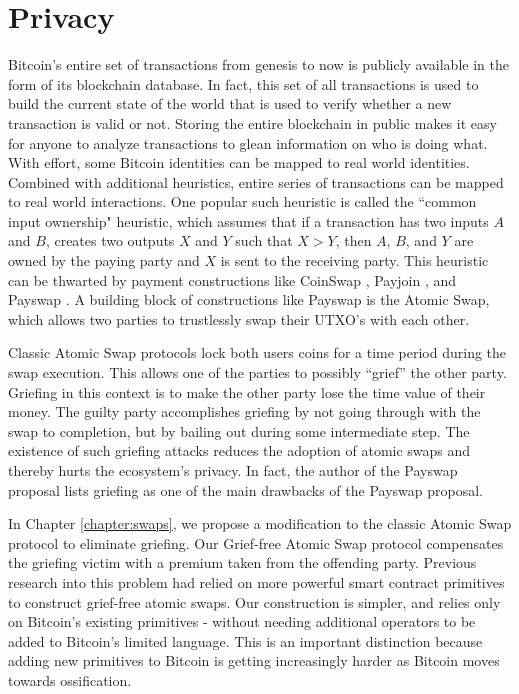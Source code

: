 \section{Privacy}
Bitcoin's entire set of transactions from genesis to now is publicly available in the form of its blockchain database. In fact, this set of all transactions is used to build the current state of the world that is used to verify whether a new transaction is valid or not. Storing the entire blockchain in public makes it easy for anyone to analyze transactions to glean information on who is doing what. With effort, some Bitcoin identities can be mapped to real world identities. Combined with additional heuristics, entire series of transactions can be mapped to real world interactions. One popular such heuristic is called the ``common input ownership" heuristic, which assumes that if a transaction has two inputs $A$ and $B$, creates two outputs $X$ and $Y$ such that $X > Y$, then $A$, $B$, and $Y$ are owned by the paying party and $X$ is sent to the receiving party. This heuristic can be thwarted by payment constructions like CoinSwap \cite{coinswap_maxwell}, Payjoin \cite{payjoin}, and Payswap \cite{payswap}. A building block of constructions like Payswap is the Atomic Swap, which allows two parties to trustlessly swap their UTXO's with each other. 

Classic Atomic Swap protocols lock both users coins for a time period during the swap execution. This allows one of the parties to possibly ``grief'' the other party. Griefing in this context is to make the other party lose the time value of their money. The guilty party accomplishes griefing by not going through with the swap to completion, but by bailing out during some intermediate step. The existence of such griefing attacks reduces the adoption of atomic swaps and thereby hurts the ecosystem's privacy. In fact, the author of the Payswap proposal lists griefing as one of the main drawbacks of the Payswap proposal.

In Chapter \ref{chapter:swaps}, we propose a modification to the classic Atomic Swap protocol to eliminate griefing. Our Grief-free Atomic Swap protocol compensates the griefing victim with a premium taken from the offending party. Previous research into this problem had relied on more powerful smart contract primitives to construct grief-free atomic swaps. Our construction is simpler, and relies only on Bitcoin's existing primitives - without needing additional operators to be added to Bitcoin's limited language. This is an important distinction because adding new primitives to Bitcoin is getting increasingly harder as Bitcoin moves towards ossification. 

